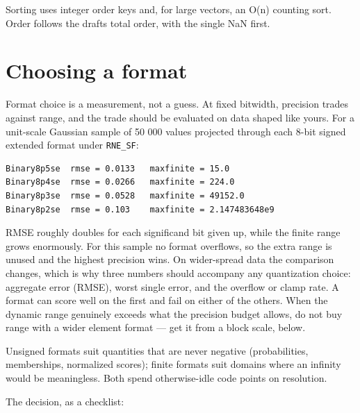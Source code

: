 Sorting uses integer order keys and, for large vectors, an O(n) counting sort. Order follows the draft{\textquotesingle}s total order, with the single NaN first.



\section{Choosing a format}



\label{10423729552281943573}{}


Format choice is a measurement, not a guess. At fixed bitwidth, precision trades against range, and the trade should be evaluated on data shaped like yours. For a unit-scale Gaussian sample of 50 000 values projected through each 8-bit signed extended format under \texttt{RNE\_\allowbreak{}SF}:




\nopagebreak[4]
\begin{verbatim}
Binary8p5se  rmse = 0.0133   maxfinite = 15.0
Binary8p4se  rmse = 0.0266   maxfinite = 224.0
Binary8p3se  rmse = 0.0528   maxfinite = 49152.0
Binary8p2se  rmse = 0.103    maxfinite = 2.147483648e9
\end{verbatim}



RMSE roughly doubles for each significand bit given up, while the finite range grows enormously. For this sample no format overflows, so the extra range is unused and the highest precision wins. On wider-spread data the comparison changes, which is why three numbers should accompany any quantization choice: aggregate error (RMSE), worst single error, and the overflow or clamp rate. A format can score well on the first and fail on either of the others. When the dynamic range genuinely exceeds what the precision budget allows, do not buy range with a wider element format — get it from a block scale, below.



Unsigned formats suit quantities that are never negative (probabilities, memberships, normalized scores); finite formats suit domains where an infinity would be meaningless. Both spend otherwise-idle code points on resolution.



The decision, as a checklist:



